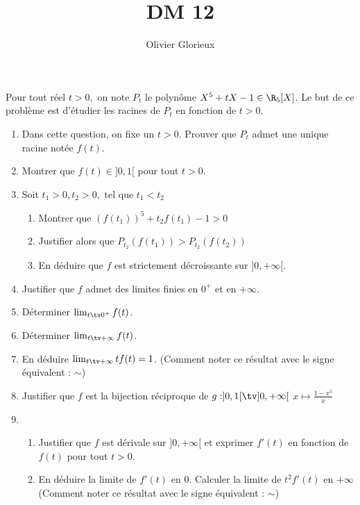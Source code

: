 \documentclass[a4paper, 11pt,reqno]{article}
\author{Olivier Glorieux}
\begin{document}
\title{DM 12 }


\begin{exercice}
Pour tout réel $t>0, $ on note $P_t$ le polynôme $X^5 +tX-1 \in \R_5[X]$. Le but de ce problème est d'étudier les racines de $P_t$ en fonction de $t>0$. 
\begin{enumerate}
\item Dans cette question, on fixe un $t>0$. Prouver que $P_t$ admet une unique racine notée $f(t)$. 
\item Montrer que $f(t) \in ]0,1[$ pour tout $t>0.$
\item Soit $t_1>0, t_2>0,$ tel que $t_1<t_2$
\begin{enumerate}
\item Montrer que $(f(t_1))^5 +t_2f(t_1) -1 >0$
\item Justifier alors que  $P_{t_2}(f(t_1)) > P_{t_2}(f(t_2))$
\item En déduire  que $f$ est strictement décroissante sur $]0,+\infty[$.
\end{enumerate}
\item Justifier que $f$ admet des limites finies en $0^+$ et en $+\infty$.

\item Déterminer $\lim_{t\tv 0^+} f(t)$. 

\item Déterminer $\lim_{t\tv+\infty} f(t)$. 
\item En déduire  $\lim_{t\tv +\infty} tf(t)= 1$. (Comment noter ce résultat avec le signe équivalent : $\sim$) 

\item Justifier que $f$ est la bijection réciproque de $g : ]0,1[\tv ]0,+\infty[$ 
$x \mapsto\frac{1-x^5}{x}$
\item \begin{enumerate}
\item Justifier que $f$ est dérivale sur $]0,+\infty[ $ et exprimer $f'(t)$ en fonction de $f(t)$ pour tout $t>0$.
\item En déduire la limite de $f'(t)$ en $0$. Calculer la limite de $t^2 f'(t)$ en $+\infty$ (Comment noter ce résultat avec le signe équivalent : $\sim$) 
\end{enumerate}
\end{enumerate}
\end{exercice}
\end{document}
